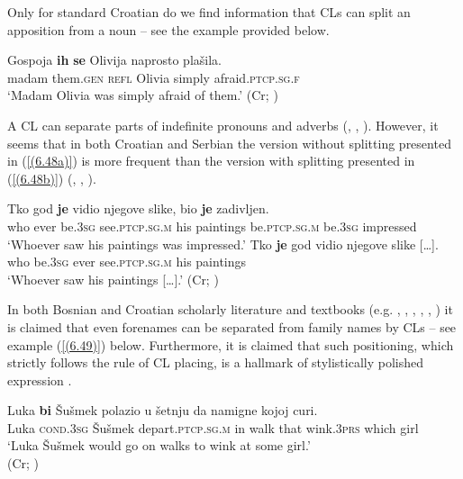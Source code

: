 Only for standard Croatian do we find information that CLs can split an apposition from a noun – see the example provided below. 

\begin{exe}\ex\label{(6.47)}
\gll Gospoja \textbf{ih} \textbf{se} Olivija naprosto plašila.\\
 madam them\textsc{.gen} \textsc{refl} Olivia simply afraid\textsc{.ptcp.sg.f}\\
\glt ‘Madam Olivia was simply afraid of them.’ 
\hfill (Cr; \citealt[597]{Baric97})
\end{exe}

\noindent A CL can separate parts of indefinite pronouns and adverbs (\citealt[cf.][496]{Katicic86}, \citealt[207]{Baric97}, \citealt[295f]{Popovic04}). However, it seems that in both Croatian and Serbian the version without splitting presented in (\ref{(6.48a)}) is more frequent than the version with splitting presented in (\ref{(6.48b)}) (\citealt[cf.][496]{Katicic86}, \citealt[207]{Baric97}, \citealt[295f, 323]{Popovic04}).

\begin{exe}\ex\begin{xlist}
\ex\label{(6.48a)}
\gll Tko god \textbf{je} vidio njegove slike, bio \textbf{je} zadivljen. \\
 who ever be\textsc{.3sg} see\textsc{.ptcp.sg.m} his paintings be\textsc{.ptcp.sg.m} be\textsc{.3sg} impressed\\
\glt ‘Whoever saw his paintings was impressed.’
\ex\label{(6.48b)}
\gll Tko \textbf{je} god vidio njegove {slike [\dots].} \\
who be\textsc{.3sg} ever see\textsc{.ptcp.sg.m} his paintings\\
\glt ‘Whoever saw his paintings [\dots].’ 
\hfill  (Cr; \citealt[207]{Baric97})
\end{xlist}
\end{exe}

\noindent In both Bosnian and Croatian scholarly literature and textbooks (e.g. \citealt[64]{Babic63}, \citealt[496]{Katicic86}, \citealt[598]{Baric97}, \citealt[471]{JHP00}, \citealt[182]{FHM06}, \citealt[195]{FrancicPetrovic13}) it is claimed that even forenames can be separated from family names by CLs – see example (\ref{(6.49)}) below. Furthermore, it is claimed that such positioning, which strictly follows the rule of CL placing, is a hallmark of stylistically polished expression \citep[cf.][496]{Katicic86}.


\begin{exe}\ex\label{(6.49)}
\gll Luka \textbf{bi} Šušmek polazio u šetnju da namigne kojoj curi.\\
 Luka \textsc{cond.3sg} Šušmek depart\textsc{.ptcp.sg.m} in walk that wink\textsc{.3prs} which girl\\
 \glt ‘Luka Šušmek would go on walks to wink at some girl.’ \\
\hfill  (Cr; \citealt[598]{Baric97})
\end{exe}

